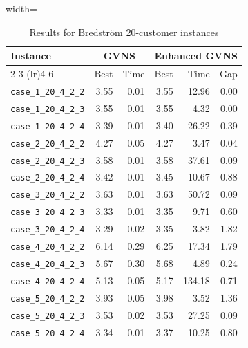 \documentclass{article}
\begin{document}
\begin{table}[h]
\centering
\small
\setlength{\tabcolsep}{3pt}
\caption{Results for Bredström 20-customer instances}
\vspace{4mm}
\begin{adjustbox}{width=\textwidth}
\begin{tabular}{l r r @{\hspace{4pt}} r r r}
\toprule
\multirow{2}{*}{Instance} & \multicolumn{2}{c}{GVNS} & \multicolumn{3}{c}{Enhanced GVNS} \\
\cmidrule(lr){2-3} \cmidrule(lr){4-6}
 & Best & Time & Best & Time & Gap \\
\midrule
\texttt{case\_1\_20\_4\_2\_2} & 3.55 & 0.01 & 3.55 & 12.96 & 0.00 \\
\texttt{case\_1\_20\_4\_2\_3} & 3.55 & 0.01 & 3.55 & 4.32 & 0.00 \\
\texttt{case\_1\_20\_4\_2\_4} & 3.39 & 0.01 & 3.40 & 26.22 & 0.39 \\
\texttt{case\_2\_20\_4\_2\_2} & 4.27 & 0.05 & 4.27 & 3.47 & 0.04 \\
\texttt{case\_2\_20\_4\_2\_3} & 3.58 & 0.01 & 3.58 & 37.61 & 0.09 \\
\texttt{case\_2\_20\_4\_2\_4} & 3.42 & 0.01 & 3.45 & 10.67 & 0.88 \\
\texttt{case\_3\_20\_4\_2\_2} & 3.63 & 0.01 & 3.63 & 50.72 & 0.09 \\
\texttt{case\_3\_20\_4\_2\_3} & 3.33 & 0.01 & 3.35 & 9.71 & 0.60 \\
\texttt{case\_3\_20\_4\_2\_4} & 3.29 & 0.02 & 3.35 & 3.82 & 1.82 \\
\texttt{case\_4\_20\_4\_2\_2} & 6.14 & 0.29 & 6.25 & 17.34 & 1.79 \\
\texttt{case\_4\_20\_4\_2\_3} & 5.67 & 0.30 & 5.68 & 4.89 & 0.24 \\
\texttt{case\_4\_20\_4\_2\_4} & 5.13 & 0.05 & 5.17 & 134.18 & 0.71 \\
\texttt{case\_5\_20\_4\_2\_2} & 3.93 & 0.05 & 3.98 & 3.52 & 1.36 \\
\texttt{case\_5\_20\_4\_2\_3} & 3.53 & 0.02 & 3.53 & 27.25 & 0.09 \\
\texttt{case\_5\_20\_4\_2\_4} & 3.34 & 0.01 & 3.37 & 10.25 & 0.80 \\
\bottomrule
\end{tabular}
\end{adjustbox}
\end{table}
\end{document}
